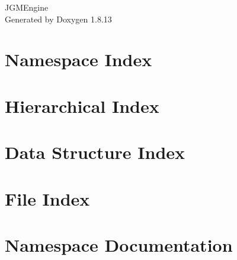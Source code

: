 \documentclass[twoside]{book}
\newcommand{\+}{\discretionary{\mbox{\scriptsize$\hookleftarrow$}}{}{}}
\newcommand{\clearemptydoublepage}{%
  \newpage{\pagestyle{empty}\cleardoublepage}%
}
\begin{document}
\hypersetup{pageanchor=false,
             bookmarksnumbered=true,
             pdfencoding=unicode
            }
\begin{titlepage}
\vspace*{7cm}
\begin{center}%
{\Large J\+G\+M\+Engine }\\
\vspace*{1cm}
{\large Generated by Doxygen 1.8.13}\\
\end{center}
\end{titlepage}
\clearemptydoublepage
{}
\tableofcontents
\clearemptydoublepage
{}
\hypersetup{pageanchor=true}

\chapter{Namespace Index}

\chapter{Hierarchical Index}

\chapter{Data Structure Index}

\chapter{File Index}

\chapter{Namespace Documentation}













































\end{document}
